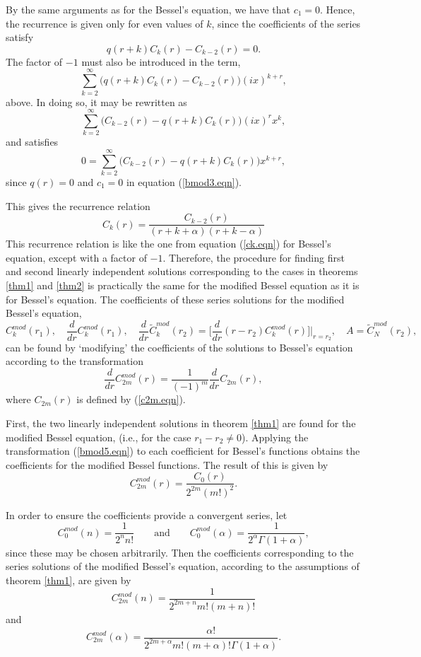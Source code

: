 \documentclass[12pt]{article}
\theoremstyle{definition}
\numberwithin{equation}{section}
\begin{document}
{By the same arguments as for the Bessel's equation, we have that $c_1=0$. Hence, the recurrence is given only for even values of $k$, since the coefficients of the series satisfy
$$q(r+k)C_k(r)-C_{k-2}(r)=0.$$
The factor of $-1$ must also be introduced in the term,
$$\sum_{k=2}^\infty\Big(q(r+k)C_k(r)-C_{k-2}(r)\Big)(ix)^{k+r},$$
above. In doing so, it may be rewritten as
$$\sum_{k=2}^\infty\Big(C_{k-2}(r)-q(r+k)C_k(r)\Big)(ix)^rx^k,$$
and satisfies
$$0=\sum_{k=2}^\infty\Big(C_{k-2}(r)-q(r+k)C_k(r)\Big)x^{k+r},$$
since $q(r)=0$ and $c_1=0$ in equation (\ref{bmod3.eqn}).

This gives the recurrence relation
\begin{equation}
C_k(r)=\frac{C_{k-2}(r)}{(r+k+\alpha)(r+k-\alpha)}
\label{bmod4.eqn}
\end{equation}
This recurrence relation is like the one from equation (\ref{ck.eqn}) for Bessel's equation, except with a factor of $-1$. Therefore, the procedure for finding first and second linearly independent solutions corresponding to the cases in theorems \ref{thm1} and \ref{thm2} is practically the same for the modified Bessel equation as it is for Bessel's equation. The coefficients of these series solutions for the modified Bessel's equation,
$$C_k^{mod}(r_1),\quad\frac{d}{dr}C_k^{mod}(r_1),\quad\frac{d}{dr}\tilde{C}_k^{mod}(r_2)=\bigg[\frac{d}{dr}(r-r_2)C_k^{mod}(r)\bigg]\bigg|_{r=r_2},\quad A= \tilde{C}_N^{mod}(r_2),$$
can be found by `modifying' the coefficients of the solutions to Bessel's equation according to the transformation
\begin{equation}
\frac{d}{dr}C_{2m}^{mod}(r)=\frac{1}{(-1)^m}\frac{d}{dr}C_{2m}(r),
\label{bmod5.eqn}
\end{equation}
where $C_{2m}(r)$ is defined by (\ref{c2m.eqn}).

First, the two linearly independent solutions in theorem \ref{thm1} are found for the modified Bessel equation, (i.e., for the case $r_1-r_2\neq 0$). Applying the transformation (\ref{bmod5.eqn}) to each coefficient for Bessel's functions obtains the coefficients for the modified Bessel functions. The result of this is given by
$$C_{2m}^{mod}(r)=\frac{C_0(r)}{2^{2m}(m!)^2}.$$

In order to ensure the coefficients provide a convergent series, let 
$$C_0^{mod}(n)=\frac{1}{2^nn!}\qquad\mbox{and}\qquad C_0^{mod}(\alpha)=\frac{1}{2^\alpha\Gamma(1+\alpha)},$$
since these may be chosen arbitrarily. Then the coefficients corresponding to the series solutions of the modified Bessel's equation, according to the assumptions of theorem \ref{thm1}, are given by
\begin{equation}
C_{2m}^{mod}(n)=\frac{1}{2^{2m+n}m!(m+n)!}
\label{bmod6.eqn}
\end{equation}
and
\begin{equation}
C_{2m}^{mod}(\alpha)=\frac{\alpha!}{2^{2m+\alpha}m!(m+\alpha)!\Gamma(1+\alpha)}.
\label{bmod7.eqn}
\end{equation}

}
\end{document}
